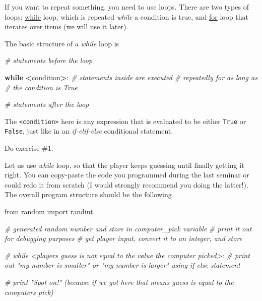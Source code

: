 \documentclass[
]{book}
\newenvironment{Shaded}{\begin{snugshade}}{\end{snugshade}}
\newcommand{\CommentTok}[1]{\textcolor[rgb]{0.56,0.35,0.01}{\textit{#1}}}
\newcommand{\ControlFlowTok}[1]{\textcolor[rgb]{0.13,0.29,0.53}{\textbf{#1}}}
\newcommand{\ImportTok}[1]{#1}
\newcommand{\NormalTok}[1]{#1}
\newcommand{\OperatorTok}[1]{\textcolor[rgb]{0.81,0.36,0.00}{\textbf{#1}}}
\begin{document}
If you want to repeat something, you need to use loops. There are two types of loops: \href{https://wiki.python.org/moin/WhileLoop}{while} loop, which is repeated \emph{while} a condition is true, and \href{https://wiki.python.org/moin/ForLoop}{for} loop that iterates over items (we will use it later).

The basic structure of a \emph{while} loop is

\begin{Shaded}
\begin{Highlighting}[]
\CommentTok{\# statements before the loop}

\ControlFlowTok{while} \OperatorTok{\textless{}}\NormalTok{condition}\OperatorTok{\textgreater{}}\NormalTok{:}
    \CommentTok{\# statements inside are executed}
    \CommentTok{\# repeatedly for as long as}
    \CommentTok{\# the condition is True}
    
\CommentTok{\# statements after the loop}
\end{Highlighting}
\end{Shaded}

The \texttt{\textless{}condition\textgreater{}} here is any expression that is evaluated to be either \texttt{True} or \texttt{False}, just like in an \emph{if-elif-else} conditional statement.

Do exercise \#1.

Let us use \emph{while} loop, so that the player keeps guessing until finally getting it right. You can copy-paste the code you programmed during the last seminar or could redo it from scratch (I would strongly recommend you doing the latter!). The overall program structure should be the following

\begin{Shaded}
\begin{Highlighting}[]
\ImportTok{from}\NormalTok{ random }\ImportTok{import}\NormalTok{ randint}

\CommentTok{\# generated random number and store in computer\_pick variable}
\CommentTok{\# print it out for debugging purposes}
\CommentTok{\# get player input, convert it to an integer, and store}

\CommentTok{\# while \textless{}players guess is not equal to the value the computer picked\textgreater{}:}
    \CommentTok{\# print out "my number is smaller" or "my number is larger" using if{-}else statement}
    
\CommentTok{\# print "Spot on!" (because if we got here that means guess is equal to the computer\textquotesingle{}s pick)}
\end{Highlighting}
\end{Shaded}
\end{document}
